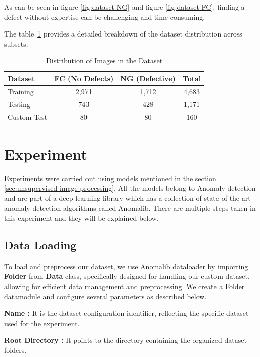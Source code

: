 As can be seen in figure \ref{fig:dataset-NG} and figure \ref{fig:dataset-FC}, finding a defect without expertise can be challenging and time-consuming.

The table~\ref{tab:dataset-distribution} provides a detailed breakdown of the dataset distribution across subsets:

\begin{table}[ht!]
    \centering
    \begin{tabular}{|l|c|c|c|}
        \hline
        \textbf{Dataset} & \textbf{FC (No Defects)} & \textbf{NG (Defective)} & \textbf{Total} \\
        \hline
        Training & 2,971 & 1,712 & 4,683 \\
        \hline
        Testing & 743 & 428 & 1,171 \\
        \hline
        Custom Test & 80 & 80 & 160 \\
        \hline
    \end{tabular}
    \caption{Distribution of Images in the Dataset}
    \label{tab:dataset-distribution}
\end{table}

\section{Experiment}

Experiments were carried out using models mentioned in the section \ref{sec:unsupervised image processing}. All the models belong to Anomaly detection and are part of a deep learning library which has a collection of state-of-the-art anomaly detection algorithms called Anomalib. There are multiple steps taken in this experiment and they will be explained below.

\subsection{Data Loading}

To load and preprocess our dataset, we use Anomalib dataloader by importing \textbf{Folder} from \textbf{Data} class, specifically designed for handling our custom dataset, allowing for efficient data management and preprocessing. We create a Folder datamodule and configure several parameters as described below.

\textbf{Name :} It is the dataset configuration identifier, reflecting the specific dataset used for the experiment.

\textbf{Root Directory :} It points to the directory containing the organized dataset folders.

